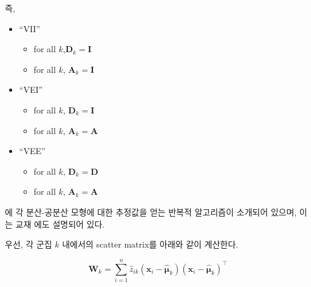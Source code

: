 \documentclass[]{book}
\newenvironment{Shaded}{\begin{snugshade}}{\end{snugshade}}
\newcommand{\ControlFlowTok}[1]{\textcolor[rgb]{0.13,0.29,0.53}{\textbf{#1}}}
\newcommand{\DataTypeTok}[1]{\textcolor[rgb]{0.13,0.29,0.53}{#1}}
\newcommand{\DecValTok}[1]{\textcolor[rgb]{0.00,0.00,0.81}{#1}}
\newcommand{\KeywordTok}[1]{\textcolor[rgb]{0.13,0.29,0.53}{\textbf{#1}}}
\newcommand{\NormalTok}[1]{#1}
\newcommand{\OperatorTok}[1]{\textcolor[rgb]{0.81,0.36,0.00}{\textbf{#1}}}
\newcommand{\StringTok}[1]{\textcolor[rgb]{0.31,0.60,0.02}{#1}}
\providecommand{\tightlist}{%
  \setlength{\itemsep}{0pt}\setlength{\parskip}{0pt}}
\begin{document}
즉,

\begin{itemize}
\tightlist
\item
  ``VII''

  \begin{itemize}
  \tightlist
  \item
    for all \(k\),\(\mathbf{D}_k = \mathbf{I}\)
  \item
    for all \(k\), \(\mathbf{A}_k = \mathbf{I}\)
  \end{itemize}
\item
  ``VEI''

  \begin{itemize}
  \tightlist
  \item
    for all \(k\), \(\mathbf{D}_k = \mathbf{I}\)
  \item
    for all \(k\), \(\mathbf{A}_k = \mathbf{A}\)
  \end{itemize}
\item
  ``VEE''

  \begin{itemize}
  \tightlist
  \item
    for all \(k\), \(\mathbf{D}_k = \mathbf{D}\)
  \item
    for all \(k\), \(\mathbf{A}_k = \mathbf{A}\)
  \end{itemize}
\end{itemize}

\citet{celeux1995gaussian} 에 각 분산-공분산 모형에 대한 추정값을 얻는 반복적 알고리즘이 소개되어 있으며, 이는 교재 \citep{jun2012datamining}에도 설명되어 있다.

우선, 각 군집 \(k\) 내에서의 scatter matrix를 아래와 같이 계산한다.

\begin{equation*}
\mathbf{W}_k = \sum_{i = 1}^{n} \hat{z}_{ik} (\mathbf{x}_i - \hat{\boldsymbol\mu}_k)(\mathbf{x}_i - \hat{\boldsymbol\mu}_k)^\top
\end{equation*}

\begin{Shaded}
\end{Shaded}
\end{document}
